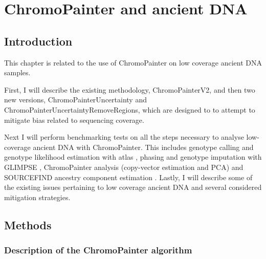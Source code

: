 \chapter{ChromoPainter and ancient DNA}
\label{chapterlabel2}

\section{Introduction}

This chapter is related to the use of ChromoPainter on low coverage ancient DNA samples. 

First, I will describe the existing methodology, ChromoPainterV2, and then two new versions, ChromoPainterUncertainty and ChromoPainterUncertaintyRemoveRegions, which are designed to to attempt to mitigate bias related to sequencing coverage. 

Next I will perform benchmarking tests on all the steps necessary to analyse low-coverage ancient DNA with ChromoPainter. This includes genotype calling and genotype likelihood estimation with atlas \cite{Link2017}, phasing and genotype imputation with GLIMPSE \cite{rubinacci2021efficient}, ChromoPainter \cite{Lawson2012} analysis (copy-vector estimation and PCA) and SOURCEFIND ancestry component estimation \cite{Chacon-Duque2018}. Lastly, I will describe some of the existing issues pertaining to low coverage ancient DNA and several considered mitigation strategies. 

\section{Methods}

\subsection{Description of the ChromoPainter algorithm}

